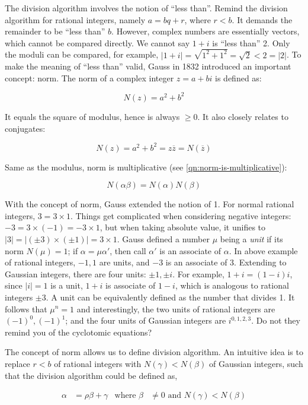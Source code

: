 \documentclass[b5paper]{article}
\begin{document}
The division algorithm involves the notion of \enquote{less than}. Remind the division algorithm for rational integers, namely $a = bq + r$, where $r < b$. It demands the remainder to be \enquote{less than} $b$. However, complex numbers are essentially vectors, which cannot be compared directly. We cannot say $1 + i$ is \enquote{less than} 2. Only the moduli can be compared, for example, $|1 + i| = \sqrt{1^2 + 1^2} = \sqrt{2} < 2 = |2|$. To make the meaning of \enquote{less than} valid, Gauss in 1832 introduced an important concept: norm. The norm of a complex integer $z = a + bi$ is defined as:

\[
N(z) = a^2 + b^2
\]

It equals the square of modulus, hence is always $\geq 0$. It also closely relates to conjugates:

\[
N(z) = a^2 + b^2 = z\overline{z} = N(\overline{z})
\]

Same as the modulus, norm is multiplicative (see \cref{qn:norm-is-multiplicative}):

\[
N(\alpha\beta) = N(\alpha)N(\beta)
\]

 
With the concept of norm, Gauss extended the notion of 1. For normal rational integers, $3 = 3 \times 1$. Things get complicated when considering negative integers: $-3 = 3 \times (-1) = -3 \times 1$, but when taking absolute value, it unifies to $|3| = |(\pm 3) \times (\pm 1)| = 3 \times 1$. Gauss defined a number $\mu$ being a \emph{unit} if its norm $N(\mu) = 1$; if $\alpha = \mu \alpha'$, then call $\alpha'$ is an associate of $\alpha$. In above example of rational integers, $-1, 1$ are units, and $-3$ is an associate of 3. Extending to Gaussian integers, there are four units: $\pm 1, \pm i$. For example, $1 + i = (1 - i)i$, since $|i| = 1$ is a unit, $1 + i$ is associate of $1 - i$, which is analogous to rational integers $\pm 3$. A unit can be equivalently defined as the number that divides 1. It follows that $\mu^n = 1$ and interestingly, the two units of rational integers are $(-1)^0, (-1)^1$; and the four units of Gaussian integers are $i^{0, 1, 2, 3}$. Do not they remind you of the cyclotomic equations?

The concept of norm allows us to define division algorithm. An intuitive idea is to replace $r < b$ of rational integers with $N(\gamma) < N(\beta)$ of Gaussian integers, such that the division algorithm could be defined as,

\begin{align*}
\alpha &= \rho \beta + \gamma & \text{where } \beta &\ne 0 \text{ and } N(\gamma) < N(\beta)
\end{align*}
\end{document}
